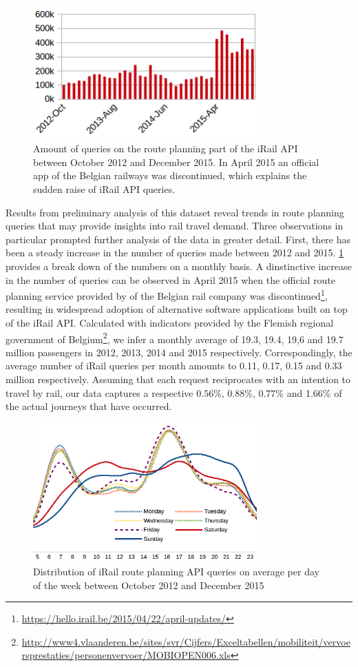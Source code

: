 \documentclass{sig-alternate}
\begin{document}
\begin{figure}
\centering
\includegraphics[width=8.6cm]{querylogs}
\caption{Amount of queries on the route planning part of the iRail API between October 2012 and December 2015. In April 2015 an official app of the Belgian railways was discontinued, which explains the sudden raise of iRail API queries.}
\label{fig:querylogs}
\end{figure}

Results from preliminary analysis of this dataset reveal trends in route planning queries that may provide insights into rail travel demand. 
Three observations in particular prompted further analysis of the data in greater detail. 
First, there has been a steady increase in the number of queries made between 2012 and 2015. 
\cref{fig:querylogs} provides a break down of the numbers on a monthly basis. 
A dinstinctive increase in the number of queries can be observed in April 2015 when the official route planning service provided by of the Belgian rail company was discontinued\footnote{\url{https://hello.irail.be/2015/04/22/april-updates/}}, resulting in widespread adoption of alternative software applications built on top of the iRail API.
Calculated with indicators provided by the Flemish regional government of Belgium\footnote{\url{http://www4.vlaanderen.be/sites/svr/Cijfers/Exceltabellen/mobiliteit/vervoersprestaties/personenvervoer/MOBIOPEN006.xls}}, we infer a monthly average of 19.3, 19.4, 19,6 and 19.7 million passengers in 2012, 2013, 2014 and 2015 respectively. 
Correspondingly, the average number of iRail queries per month amounts to 0.11, 0.17, 0.15 and 0.33 million respectively.
Assuming that each request reciprocates with an intention to travel by rail, our data captures a respective $0.56\%$, 0.88\%, 0.77\% and 1.66\% of the actual journeys that have occurred.

\begin{figure}
\centering
\includegraphics[width=8.6cm]{avg-all}
\caption{Distribution of iRail route planning API queries on average per day of the week between October 2012 and December 2015}
\label{fig:average}
\end{figure}
\end{document}
